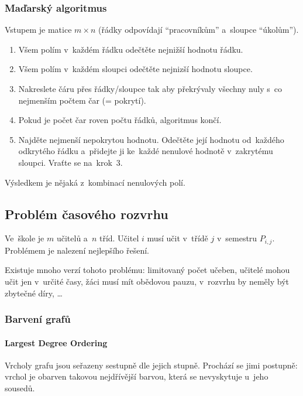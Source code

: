 \subsubsection{Maďarský algoritmus}

Vstupem je matice $m \times n$ (řádky odpovídají \enquote{pracovníkům} a~sloupce \enquote{úkolům}).

\begin{enumerate}
    \item Všem polím v~každém řádku odečtěte nejnižší hodnotu řádku.
    \item Všem polím v~každém sloupci odečtěte nejnizší hodnotu sloupce.
    \item Nakreslete čáru přes řádky/sloupce tak aby překrývaly všechny nuly s~co nejmenším počtem čar (= pokrytí).
    \item Pokud je počet čar roven počtu řádků, algoritmus končí.
    \item Najděte nejmenší nepokrytou hodnotu. Odečtěte její hodnotu od~každého odkrytého řádku a~přidejte ji ke~každé nenulové hodnotě v~zakrytému sloupci. Vraťte se na~krok~3.
\end{enumerate}

Výsledkem je nějaká z~kombinací nenulových polí.

\subsection{Problém časového rozvrhu}

Ve~škole je $m$ učitelů a~$n$ tříd.
Učitel $i$ musí učit v~třídě $j$ v~semestru $P_{i,j}$.
Problémem je nalezení nejlepšího řešení.

Existuje mnoho verzí tohoto problému:
limitovaný počet učeben,
učitelé mohou učit jen v~určité časy,
žáci musí mít obědovou pauzu,
v~rozvrhu by neměly být zbytečné díry,
\dots

\subsubsection{Barvení grafů}

\paragraph{Largest Degree Ordering}

Vrcholy grafu jsou seřazeny sestupně dle jejich stupně.
Prochází se jimi postupně: vrchol je obarven takovou nejdřívější barvou, která se nevyskytuje u~jeho sousedů.

